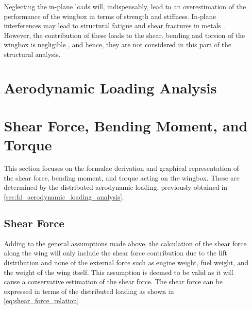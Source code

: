 \noindent Neglecting the in-plane loads will, indispensably, lead to an overestimation of the performance of the wingbox in terms of strength and stiffness. In-plane interferences may lead to structural fatigue and shear fractures in metals \cite{Yin2015AMaterials}. However, the contribution of these loads to the shear, bending and torsion of the wingbox is negligible \cite{Timmer2024AE2111-IReader}, and hence, they are not considered in this part of the structural analysis.














\section{Aerodynamic Loading Analysis}  \label{sec:fd_aerodynamic_loading_analysis}


\section{Shear Force, Bending Moment, and Torque}   \label{sec:fd_shear_moment_torque}

This section focuses on the formulae derivation and graphical representation of the shear force, bending moment, and torque acting on the wingbox. These are determined by the distributed aerodynamic loading, previously obtained in \autoref{sec:fd_aerodynamic_loading_analysis}.

\subsection*{Shear Force}
\noindent Adding to the general assumptions made above, the calculation of the shear force along the wing will only include the shear force contribution due to the lift distribution and none of the external force such as engine weight, fuel weight, and the weight of the wing itself. This assumption is deemed to be valid as it will cause a conservative estimation of the shear force. The shear force can be expressed in terms of the distributed loading as shown in \autoref{eq:shear_force_relation}

